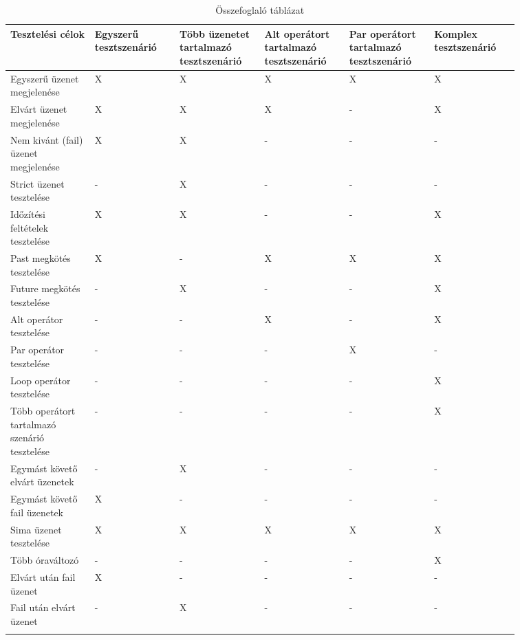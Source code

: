 \begin{longtable}{|p{0.1428\linewidth}|p{0.1428\linewidth}|p{0.1428\linewidth}|p{0.1428\linewidth}|p{0.1428\linewidth}|p{0.1428\linewidth}|}
\hline
\textbf{Tesztelési célok} & \textbf{Egyszerű tesztszenárió} & \textbf{Több üzenetet tartalmazó tesztszenárió} & \textbf{Alt operátort tartalmazó tesztszenárió} & \textbf{Par operátort tartalmazó tesztszenárió} & \textbf{Komplex tesztszenárió}\\
\hline
Egyszerű üzenet megjelenése & X & X & X & X & X\\
\hline
Elvárt üzenet megjelenése & X & X & X & - & X\\
\hline
Nem kivánt (fail) üzenet megjelenése & X & X & - & - & -\\
\hline
Strict üzenet tesztelése & - & X & - & - & -\\
\hline
Időzítési feltételek tesztelése & X & X & - & - & X\\
\hline
Past megkötés tesztelése & X & - & X & X & X\\
\hline
Future megkötés tesztelése & - & X & - & - & X\\
\hline
Alt operátor tesztelése & - & - & X & - & X\\
\hline
Par operátor tesztelése & - & - & - & X & -\\
\hline
Loop operátor tesztelése & - & - & - & - & X\\
\hline
Több operátort tartalmazó szenárió tesztelése & - & - & - & - & X\\
\hline
Egymást követő elvárt üzenetek & - & X & - & - & -\\
\hline
Egymást követő fail üzenetek & X & - & - & - & -\\
\hline
Sima üzenet tesztelése & X & X & X & X & X\\
\hline
Több óraváltozó & - & - & - & - & X\\
\hline
Elvárt után fail üzenet & X & - & - & - & -\\
\hline
Fail után elvárt üzenet & - & X & - & - & -\\
\hline
\caption{Összefoglaló táblázat}
\label{tab:table1}
\end{longtable}